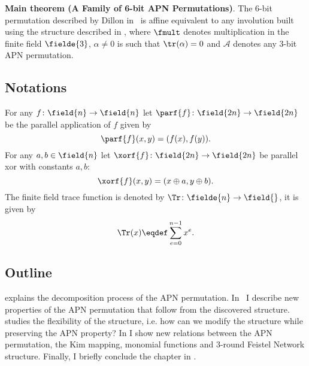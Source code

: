 \textbf{Main theorem (A Family of 6-bit APN Permutations)}.
The 6-bit permutation described by Dillon \etal{} in~\cite{DillonAPN} is affine equivalent to any involution built using the structure described in , where $\fmult$ denotes multiplication in the finite field $\fielde{3}$, $\alpha \neq 0$ is such that $\tr(\alpha) = 0$ and $\mathcal{A}$ denotes any 3-bit APN permutation.

\subsection{Notations}
For any $f\colon \field{n} \to \field{n}$ let $\parf{f}\colon \field{2n} \to \field{2n}$ be the parallel application of $f$ given by
$$
\parf{f}(x,y) = (f(x), f(y)).
$$
For any $a,b \in \field{n}$ let $\xorf{f}\colon \field{2n} \to \field{2n}$ be parallel xor with constants $a,b$:
$$
\xorf{f}(x,y) = (x \oplus a, y \oplus b).
$$
The finite field trace function is denoted by $\Tr\colon \fielde{n} \to \field{}$, it is given by
$$
\Tr(x) \eqdef \sum_{e=0}^{n-1} x^e.
$$

\subsection{Outline}
 explains the decomposition process of the APN permutation. In~ I describe new properties of the APN permutation that follow from the discovered structure.  studies the flexibility of the structure, i.e. how can we modify the structure while preserving the APN property?
In  I show new relations between the APN permutation, the Kim mapping, monomial functions and 3-round Feistel Network structure. Finally, I briefly conclude the chapter in .
